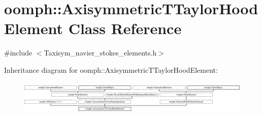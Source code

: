 \hypertarget{classoomph_1_1AxisymmetricTTaylorHoodElement}{}\section{oomph\+:\+:Axisymmetric\+T\+Taylor\+Hood\+Element Class Reference}
\label{classoomph_1_1AxisymmetricTTaylorHoodElement}


{\ttfamily \#include $<$Taxisym\+\_\+navier\+\_\+stokes\+\_\+elements.\+h$>$}

Inheritance diagram for oomph\+:\+:Axisymmetric\+T\+Taylor\+Hood\+Element\+:\begin{figure}[H]
\begin{center}
\leavevmode
\includegraphics[height=1.671642cm]{classoomph_1_1AxisymmetricTTaylorHoodElement}
\end{center}
\end{figure}
